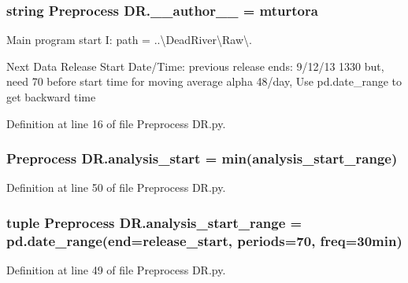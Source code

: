 \subsubsection[{\+\_\+\+\_\+author\+\_\+\+\_\+}]{\setlength{\rightskip}{0pt plus 5cm}string Preprocess D\+R.\+\_\+\+\_\+author\+\_\+\+\_\+ = \textquotesingle{}mturtora\textquotesingle{}}\label{namespace_preprocess_01_d_r_a28ebd37638b2a3edddcef38b03de3d9e}


Main program start I\+: path = \textquotesingle{}..\textbackslash{}Dead\+River\textbackslash{}Raw\textbackslash{}\textquotesingle{}. 

Next Data Release Start Date/\+Time\+: previous release ends\+: 9/12/13 1330 but, need 70 before start time for moving average alpha 48/day, Use pd.\+date\+\_\+range to get backward time 

Definition at line 16 of file Preprocess D\+R.\+py.

\hypertarget{namespace_preprocess_01_d_r_a21ae2b6d07fc5f6bee079d47f29346d4}{}
\subsubsection[{analysis\+\_\+start}]{\setlength{\rightskip}{0pt plus 5cm}Preprocess D\+R.\+analysis\+\_\+start = min({\bf analysis\+\_\+start\+\_\+range})}\label{namespace_preprocess_01_d_r_a21ae2b6d07fc5f6bee079d47f29346d4}


Definition at line 50 of file Preprocess D\+R.\+py.

\hypertarget{namespace_preprocess_01_d_r_ad43a2a5b2765a6fdb69bd61e0617774a}{}
\subsubsection[{analysis\+\_\+start\+\_\+range}]{\setlength{\rightskip}{0pt plus 5cm}tuple Preprocess D\+R.\+analysis\+\_\+start\+\_\+range = pd.\+date\+\_\+range(end={\bf release\+\_\+start}, periods=70, freq=\textquotesingle{}30min\textquotesingle{})}\label{namespace_preprocess_01_d_r_ad43a2a5b2765a6fdb69bd61e0617774a}


Definition at line 49 of file Preprocess D\+R.\+py.


